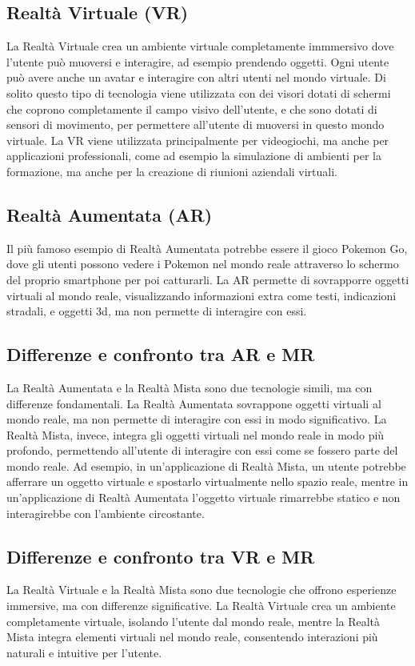 \subsection{Realtà Virtuale (VR) }
La Realtà Virtuale crea un ambiente virtuale completamente immmersivo dove l'utente può muoversi e interagire, ad esempio prendendo oggetti. Ogni utente può avere anche un avatar e interagire con altri utenti nel mondo virtuale. Di solito questo tipo di tecnologia viene utilizzata con dei visori dotati di schermi che coprono completamente il campo visivo dell'utente, e che sono dotati di sensori di movimento, per permettere all'utente di muoversi in questo mondo virtuale. La VR viene utilizzata principalmente per videogiochi, ma anche per applicazioni professionali, come ad esempio la simulazione di ambienti per la formazione, ma anche per la creazione di riunioni aziendali virtuali.

\subsection{Realtà Aumentata (AR) }
Il più famoso esempio di Realtà Aumentata potrebbe essere il gioco Pokemon Go, dove gli utenti possono vedere i Pokemon nel mondo reale attraverso lo schermo del proprio smartphone per poi catturarli. La AR permette di sovrapporre oggetti virtuali al mondo reale, visualizzando informazioni extra come testi, indicazioni stradali, e oggetti 3d, ma non permette di interagire con essi.

\subsection{Differenze e confronto tra AR e MR}
La Realtà Aumentata e la Realtà Mista sono due tecnologie simili, ma con differenze fondamentali. La Realtà Aumentata sovrappone oggetti virtuali al mondo reale, ma non permette di interagire con essi in modo significativo. La Realtà Mista, invece, integra gli oggetti virtuali nel mondo reale in modo più profondo, permettendo all'utente di interagire con essi come se fossero parte del mondo reale. Ad esempio, in un'applicazione di Realtà Mista, un utente potrebbe afferrare un oggetto virtuale e spostarlo virtualmente nello spazio reale, mentre in un'applicazione di Realtà Aumentata l'oggetto virtuale rimarrebbe statico e non interagirebbe con l'ambiente circostante.

\subsection{Differenze e confronto tra VR e MR}
La Realtà Virtuale e la Realtà Mista sono due tecnologie che offrono esperienze immersive, ma con differenze significative. La Realtà Virtuale crea un ambiente completamente virtuale, isolando l'utente dal mondo reale, mentre la Realtà Mista integra elementi virtuali nel mondo reale, consentendo interazioni più naturali e intuitive per l'utente.

\cite{DifferenceMeta-AR-VR-MR} \cite{DifferenceIBM-AR-VR-MR}
